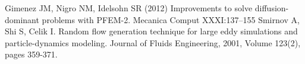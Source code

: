  Gimenez JM, Nigro NM, Idelsohn SR (2012) Improvements to solve diffusion-dominant problems with PFEM-2. Mecanica Comput XXXI:137–155
 Smirnov A, Shi S, Celik I. Random flow generation technique for large eddy simulations and particle-dynamics modeling. Journal of Fluids Engineering, 2001, Volume 123(2), pages 359-371.
